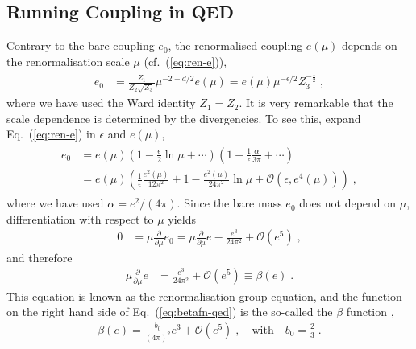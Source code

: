 \documentclass[12pt]{report}
\newcommand{\2}{\ensuremath{\sqrt{2}\,}}
\begin{document}
{      \subsection{Running Coupling in QED} 
      Contrary to the bare coupling $e_0$, the renormalised coupling $e(\mu)$ depends on the
      renormalisation scale $\mu$ (cf.~(\ref{eq:ren-e})),
      \begin{align*}
        e_0 &= \frac{Z_1}{Z_2 \sqrt{Z_3}} \mu^{-2+d/2} e (\mu) 
           = e(\mu) \mu^{-\epsilon/2} Z_3^{-\frac{1}{2}}\;,
      \end{align*}
      where we have used  
      the Ward identity $Z_1=Z_2$. It is very remarkable that the scale dependence is determined
      by the divergencies. To see this,
      expand Eq.~(\ref{eq:ren-e}) in $\epsilon$ and $e(\mu)$, 
      \begin{align}
        \begin{split}
          e_0 &= e(\mu)\left(1-\frac{\epsilon}{2} \ln \mu + \dotsm \right) \left(1 +
            \frac{1}{\epsilon} \frac{\alpha}{3\pi} + \dotsm\right) \\
          & = e(\mu)\left(\frac{1}{\epsilon} \frac{e^2(\mu)}{12\pi^2} + 1 - \frac{e^2(\mu)}{24\pi^2} \ln\mu
            +\mathcal{O}\left(\epsilon, e^4(\mu)\right)\right)\;,
        \end{split}
      \end{align}
      where we have used $\alpha=e^2/(4\pi)$. Since the bare mass $e_0$ does not depend on $\mu$,
      differentiation with respect to $\mu$ yields
      \begin{align}
        0&=\mu \frac{\partial}{\partial\mu} e_0 = \mu \frac{\partial}{\partial\mu} e -
        \frac{e^3}{24\pi^2} +\mathcal{O}\left(e^5\right) \;,
       \end{align}
      and therefore
      \begin{align}
        \mu \frac{\partial}{\partial\mu} e &= \frac{e^3}{24\pi^2}
        +\mathcal{O}\left(e^5\right) \equiv \beta(e)\;.\label{eq:betafn-qed}
      \end{align}
      This equation is known as the
      renormalisation group equation, and the function on the
      right hand side of Eq.~(\ref{eq:betafn-qed}) is the so-called the $\beta$ function
      ,
      \begin{align}
      \beta(e)=\frac{b_0}{(4\pi)^2} e^3 +\mathcal{O}\left(e^5\right)\;,\quad 
      \text{with} \quad b_0=\frac{2}{3}\;.
      \end{align} 
      
}
\end{document}
